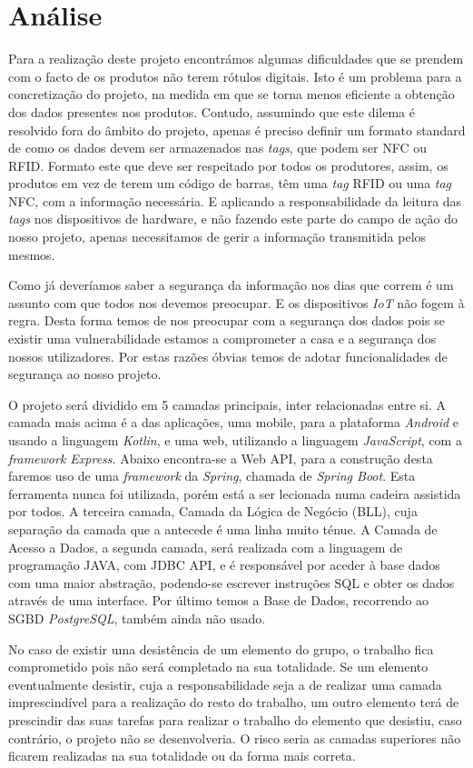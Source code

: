 %
%
\chapter*{Análise} \label{Analise}

Para a realização deste projeto encontrámos algumas dificuldades que se prendem com o facto de os produtos não terem rótulos digitais. Isto é um problema para a concretização do projeto, na medida em que se torna menos eficiente a obtenção dos dados presentes nos produtos. Contudo, assumindo que este dilema é resolvido fora do âmbito do projeto, apenas é preciso definir um formato standard de como os dados devem ser armazenados nas \textit{tags}, que podem ser NFC ou RFID. Formato este que deve ser respeitado por todos os produtores, assim, os produtos em vez de terem um código de barras, têm uma \textit{tag} RFID ou uma \textit{tag} NFC, com a informação necessária. E aplicando a responsabilidade da leitura das \textit{tags} nos dispositivos de hardware, e não fazendo este parte do campo de ação do nosso projeto, apenas necessitamos de gerir a informação transmitida pelos mesmos.

Como já deveríamos saber a segurança da informação nos dias que correm é um assunto com que todos nos devemos preocupar. E os dispositivos \textit{IoT} não fogem à regra. Desta forma temos de nos preocupar com a segurança dos dados pois se existir uma vulnerabilidade estamos a comprometer a casa e a segurança dos nossos utilizadores. Por estas razões óbvias temos de adotar funcionalidades de segurança ao nosso projeto.

O projeto será dividido em 5 camadas principais, inter relacionadas entre si. A camada mais acima é a das aplicações, uma mobile, para a plataforma \textit{Android} e usando a linguagem \textit{Kotlin}, e uma web, utilizando a linguagem \textit{JavaScript}, com a \textit{framework Express}. Abaixo encontra-se a Web API, para a construção desta faremos uso de uma \textit{framework} da \textit{Spring}, chamada de \textit{Spring Boot}. Esta ferramenta nunca foi utilizada, porém está a ser lecionada numa cadeira assistida por todos. A terceira camada, Camada da Lógica de Negócio (BLL), cuja separação da camada que a antecede é uma linha muito ténue. A Camada de Acesso a Dados, a segunda camada, será realizada com a linguagem de programação JAVA, com JDBC API, e é responsável por aceder à base dados com uma maior abstração, podendo-se escrever instruções SQL e obter os dados através de uma interface. Por último temos a Base de Dados, recorrendo ao SGBD \textit{PostgreSQL}, também ainda não usado.

No caso de existir uma desistência de um elemento do grupo, o trabalho fica comprometido pois não será completado na sua totalidade. Se um elemento eventualmente desistir, cuja a responsabilidade seja a de realizar uma camada imprescindível para a realização do resto do trabalho, um outro elemento terá de prescindir das suas tarefas para realizar o trabalho do elemento que desistiu, caso contrário, o projeto não se desenvolveria. O risco seria as camadas superiores não ficarem realizadas na sua totalidade ou da forma mais correta.